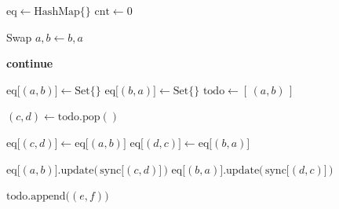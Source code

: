 \documentclass[a4paper]{article}
\begin{document}
\begin{algorithm}
\begin{algorithmic}[1]

        \State $\mathrm{eq} \gets \mathrm{HashMap}\{\}$
        \State $\mathrm{cnt} \gets 0$


                \State Swap $a,b \gets b,a$
            \EndIf

                \State \textbf{continue}
            \EndIf

            \State $\mathrm{eq}\bigl[(a,b)\bigr] \gets \mathrm{Set}\{\}$
            \State $\mathrm{eq}\bigl[(b,a)\bigr] \gets \mathrm{Set}\{\}$
            \State $\mathrm{todo} \gets [\,(a,b)\,]$

                \State $(c,d) \gets \mathrm{todo}.\mathrm{pop}()$

                \State $\mathrm{eq}\bigl[(c,d)\bigr] \gets \mathrm{eq}\bigl[(a,b)\bigr]$
                \State $\mathrm{eq}\bigl[(d,c)\bigr] \gets \mathrm{eq}\bigl[(b,a)\bigr]$

                \State $\mathrm{eq}\bigl[(a,b)\bigr].\mathrm{update}\bigl(\,\mathrm{sync}\bigl[(c,d)\bigr]\,\bigr)$
                \State $\mathrm{eq}\bigl[(b,a)\bigr].\mathrm{update}\bigl(\,\mathrm{sync}\bigl[(d,c)\bigr]\,\bigr)$

                        \State $\mathrm{todo}.\mathrm{append}\bigl((e,f)\bigr)$
                    \EndIf
                \EndFor
            \EndWhile

        \EndFor

        \State {}

    \EndFunction
\end{algorithmic} 
\end{algorithm}



\end{document}
